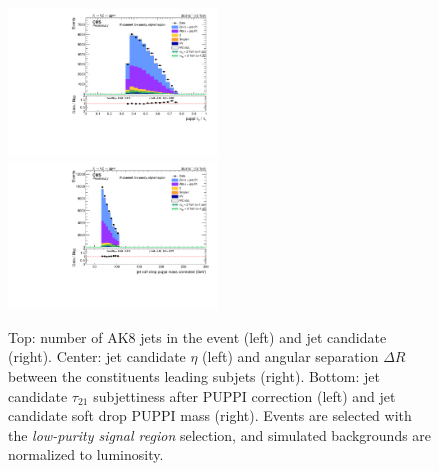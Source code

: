 \begin{figure}[!htb]
\begin{center}
    \includegraphics[width=0.495\textwidth]{plots/v9_U/XVZnnlpSR/FatJet1_puppiTau21.pdf}
    \includegraphics[width=0.495\textwidth]{plots/v9_U/XVZnnlpSR/FatJet1_softdropPuppiMassCorr.pdf}

    \caption{Top: number of AK8 jets in the event (left) and \V jet candidate \pt (right). Center: \V jet candidate $\eta$ (left) and angular separation $\Delta R$ between the constituents leading subjets (right). Bottom: \V jet candidate $\tau_{21}$ subjettiness after PUPPI correction (left) and \V jet candidate soft drop PUPPI mass (right). Events are selected with the \emph{low-purity signal region} selection, and simulated backgrounds are normalized to luminosity.}
  \end{center}
\end{figure}


